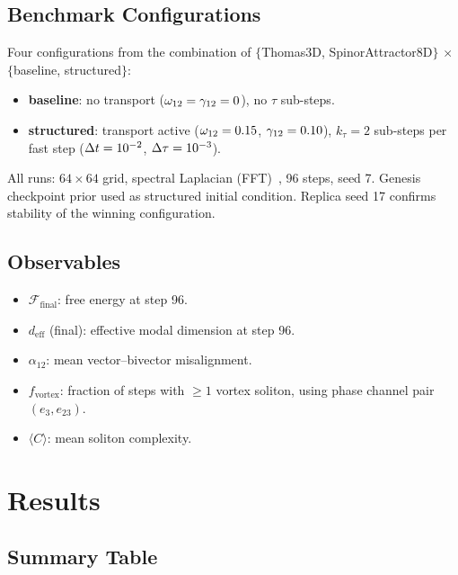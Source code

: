 \documentclass[11pt,a4paper]{article}
\begin{document}
\subsection{Benchmark Configurations}

Four configurations from the combination of $\{$Thomas3D, SpinorAttractor8D$\}$
$\times$ $\{$baseline, structured$\}$:

\begin{itemize}
  \item \textbf{baseline}: no transport ($\omega_{12} = \gamma_{12} = 0$), no $\tau$ sub-steps.
  \item \textbf{structured}: transport active ($\omega_{12} = 0.15$, $\gamma_{12} = 0.10$),
        $k_\tau = 2$ sub-steps per fast step ($\Delta t = 10^{-2}$, $\Delta\tau = 10^{-3}$).
\end{itemize}

All runs: $64\times64$ grid, spectral Laplacian (FFT)~\cite{jax2018}, 96 steps, seed 7.
Genesis checkpoint prior used as structured initial condition.
Replica seed 17 confirms stability of the winning configuration.

\subsection{Observables}

\begin{itemize}
  \item $\mathcal{F}_{\mathrm{final}}$: free energy at step 96.
  \item $d_{\mathrm{eff}}$ (final): effective modal dimension at step 96.
  \item $\alpha_{12}$: mean vector--bivector misalignment.
  \item $f_{\mathrm{vortex}}$: fraction of steps with $\geq 1$ vortex soliton,
        using phase channel pair $(e_3, e_{23})$.
  \item $\langle C \rangle$: mean soliton complexity.
\end{itemize}

\section{Results}

\subsection{Summary Table}
\end{document}

